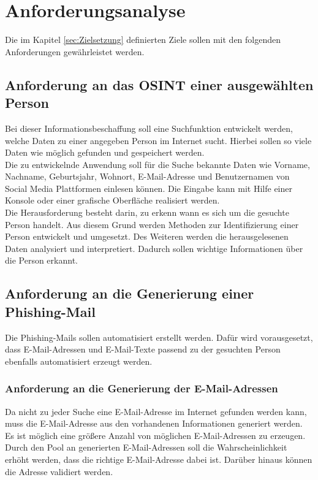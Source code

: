 
\chapter{Anforderungsanalyse}  %
\label{cha:Anforderungsanalyse} %
Die im Kapitel \ref{sec:Zielsetzung} definierten Ziele sollen mit den folgenden Anforderungen gewährleistet werden.

\section{Anforderung an das OSINT einer ausgewählten Person}
Bei dieser Informationsbeschaffung soll eine Suchfunktion entwickelt werden, welche Daten zu einer angegeben Person im Internet sucht. Hierbei sollen so viele Daten wie möglich gefunden und gespeichert werden.\\
Die zu entwickelnde Anwendung soll für die Suche bekannte Daten wie Vorname, Nachname, Geburtsjahr, Wohnort, E-Mail-Adresse und Benutzernamen von Social Media Plattformen einlesen können. Die Eingabe kann mit Hilfe einer Konsole oder einer grafische Oberfläche realisiert werden.\\
Die Herausforderung besteht darin, zu erkenn wann es sich um die gesuchte Person handelt. Aus diesem Grund werden Methoden zur Identifizierung einer Person entwickelt und umgesetzt. Des Weiteren werden die herausgelesenen Daten analysiert und interpretiert. Dadurch sollen wichtige Informationen über die Person erkannt.

\section{Anforderung an die Generierung einer Phishing-Mail}
Die Phishing-Mails sollen automatisiert erstellt werden. Dafür wird vorausgesetzt, dass E-Mail-Adressen und E-Mail-Texte passend zu der gesuchten Person ebenfalls automatisiert erzeugt werden.
	\subsection{Anforderung an die Generierung der E-Mail-Adressen}
	Da nicht zu jeder Suche eine E-Mail-Adresse im Internet gefunden werden kann, muss die E-Mail-Adresse aus den vorhandenen Informationen generiert werden. Es ist möglich eine größere Anzahl von möglichen E-Mail-Adressen zu erzeugen. Durch den Pool an generierten E-Mail-Adressen soll die Wahrscheinlichkeit erhöht werden, dass die richtige E-Mail-Adresse dabei ist. Darüber hinaus können die Adresse validiert werden.
